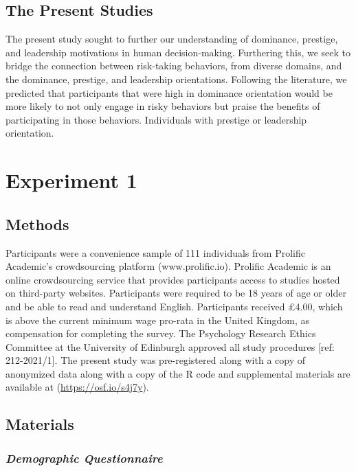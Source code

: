 \documentclass[
  donotrepeattitle,doc, 12pt, a4paper,floatsintext]{apa7}
\begin{document}
\hypertarget{the-present-studies}{%
\subsection{The Present Studies}\label{the-present-studies}}
The present study sought to further our understanding of dominance, prestige, and leadership motivations in human decision-making. Furthering this, we seek to bridge the connection between risk-taking behaviors, from diverse domains, and the dominance, prestige, and leadership orientations. Following the literature, we predicted that participants that were high in dominance orientation would be more likely to not only engage in risky behaviors but praise the benefits of participating in those behaviors. Individuals with prestige or leadership orientation.
\hypertarget{experiment-1}{%
\section{Experiment 1}\label{experiment-1}}
\hypertarget{methods}{%
\subsection{Methods}\label{methods}}
Participants were a convenience sample of 111 individuals from Prolific Academic's crowdsourcing platform (www.prolific.io). Prolific Academic is an online crowdsourcing service that provides participants access to studies hosted on third-party websites. Participants were required to be 18 years of age or older and be able to read and understand English. Participants received £4.00, which is above the current minimum wage pro-rata in the United Kingdom, as compensation for completing the survey. The Psychology Research Ethics Committee at the University of Edinburgh approved all study procedures {[}ref: 212-2021/1{]}. The present study was pre-registered along with a copy of anonymized data along with a copy of the R code and supplemental materials are available at (\url{https://osf.io/s4j7y}).
\hypertarget{materials}{%
\subsection{Materials}\label{materials}}
\hypertarget{demographic-questionnaire}{%
\subsubsection{\texorpdfstring{\emph{Demographic Questionnaire}}{Demographic Questionnaire}}\label{demographic-questionnaire}}
\end{document}
